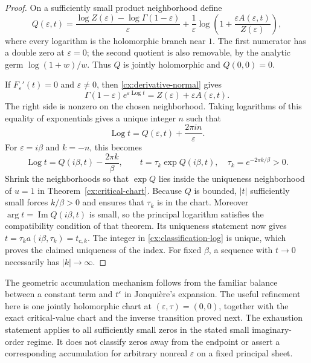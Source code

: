 \documentclass[11pt,a4paper]{article}
\numberwithin{equation}{section}
\theoremstyle{definition}
\theoremstyle{remark}
\DeclareMathOperator{\Log}{Log}
\begin{document}
\begin{proof}
On a sufficiently small product neighborhood define
\begin{equation}\label{cx:classification-Q}
 Q(\varepsilon,t)=
 \frac{\log Z(\varepsilon)-\log\Gamma(1-\varepsilon)}{\varepsilon}
 +\frac1\varepsilon
       \log\left(1+\frac{\varepsilon A(\varepsilon,t)}{Z(\varepsilon)}\right),
\end{equation}
where every logarithm is the holomorphic branch near $1$.
The first numerator has a double zero at $\varepsilon=0$; the second
quotient is also removable, by the analytic germ $\log(1+w)/w$.
Thus $Q$ is jointly holomorphic and $Q(0,0)=0$.

If $F_\varepsilon'(t)=0$ and $\varepsilon\ne0$, then
\eqref{cx:derivative-normal} gives
\[
 \Gamma(1-\varepsilon)e^{\varepsilon\Log t}
   =Z(\varepsilon)+\varepsilon A(\varepsilon,t).
\]
The right side is nonzero on the chosen neighborhood. Taking logarithms
of this equality of exponentials gives a unique integer $n$ such that
\[
 \Log t=Q(\varepsilon,t)+\frac{2\pi i n}{\varepsilon}.
\]
For $\varepsilon=i\beta$ and $k=-n$, this becomes
\begin{equation}\label{cx:classification-log}
 \Log t=Q(i\beta,t)-\frac{2\pi k}{\beta},\qquad
 t=\tau_k\exp Q(i\beta,t),\quad \tau_k=e^{-2\pi k/\beta}>0.
\end{equation}
Shrink the neighborhoods so that $\exp Q$ lies inside the uniqueness
neighborhood of $u=1$ in Theorem~\ref{cx:critical-chart}. Because $Q$ is
bounded, $|t|$ sufficiently small forces $k/\beta>0$ and ensures that
$\tau_k$ is in the chart. Moreover
$\arg t=\operatorname{Im}Q(i\beta,t)$ is small, so the principal
logarithm satisfies the compatibility condition of that theorem.
Its uniqueness statement now gives
$t=\tau_k a(i\beta,\tau_k)=t_{c,k}$. The integer in
\eqref{cx:classification-log} is unique, which proves the claimed
uniqueness of the index. For fixed $\beta$, a sequence with $t\to0$
necessarily has $|k|\to\infty$.
\end{proof}


The geometric accumulation mechanism follows from the familiar balance
between a constant term and $t^{\varepsilon}$ in Jonqui\`ere's expansion.
The useful refinement here is one jointly holomorphic chart at
$(\varepsilon,\tau)=(0,0)$, together with the exact critical-value chart
and the inverse transition proved next.  The exhaustion statement applies to all sufficiently small zeros in
the stated small imaginary-order regime. It does not classify zeros
away from the endpoint or assert a corresponding accumulation
for arbitrary nonreal $\varepsilon$ on a fixed principal sheet.
\end{document}
